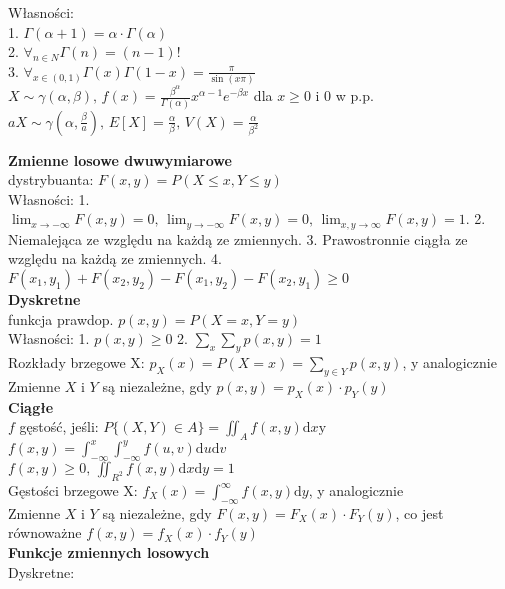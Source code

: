 \documentclass[10pt,landscape,a4paper,notitlepage]{article}
\begin{document}
\begin{multicols*}{4}
        Własności:\\
        1. $\Gamma(\alpha+1)=\alpha\cdot\Gamma(\alpha)$\\
        2. $\forall_{n\in N}\Gamma(n)=(n-1)!$\\
        3. $\forall_{x\in(0,1)}\Gamma(x)\Gamma(1-x)=\frac{\pi}{\sin(x\pi)}$\\
        $X\sim \gamma(\alpha,\beta),\,f(x)=\frac{\beta^{\alpha}}{\Gamma(\alpha)}x^{\alpha-1}e^{-\beta x}$ dla $x\geq 0$ i $0$ w p.p.\\
        $aX\sim\gamma(\alpha,\frac{\beta}{a}),\,E[X]=\frac{\alpha}{\beta},\,V(X)=\frac{\alpha}{\beta^2}$

        \noindent\textbf{\large Zmienne losowe dwuwymiarowe}\\
        dystrybuanta: $F(x,y)=P(X\leq x,Y\leq y)$\\
        Własności: 
        1. $\lim_{x\rightarrow-\infty}F(x,y)=0,\,\lim_{y\rightarrow-\infty}F(x,y)=0,\,\lim_{x,y\rightarrow\infty}F(x,y)=1$.
        2. Niemalejąca ze względu na każdą ze zmiennych.
        3. Prawostronnie ciągła ze względu na każdą ze zmiennych.
        4. $F(x_1,y_1)+F(x_2,y_2)-F(x_1,y_2)-F(x_2,y_1)\geq 0$\\
        \textbf{Dyskretne}\\
        funkcja prawdop. $p(x,y)=P(X=x,Y=y)$\\
        Własności:
        1. $p(x,y)\geq 0$
        2. $\sum_x\sum_yp(x,y)=1$\\
        Rozkłady brzegowe X: $p_X(x)=P(X=x)=\sum_{y\in Y}p(x,y)$, y analogicznie\\
        Zmienne $X$ i $Y$ są niezależne, gdy $p(x,y)=p_X(x)\cdot p_Y(y)$\\
        \textbf{Ciągłe}\\
        $f$ gęstość, jeśli: 
        $P\{(X,Y)\in A\}=\iint_Af(x,y)\mathrm{d}x\mathrm{y}$\\
        $f(x,y)=\int_{-\infty}^x\int_{-\infty}^yf(u,v)\mathrm{d}u\mathrm{d}v$\\
        $f(x,y)\geq 0,\,\iint_{R^2}f(x,y)\mathrm{d}x\mathrm{d}y=1$\\
        Gęstości brzegowe X: $f_X(x)=\int_{-\infty}^{\infty}f(x,y)\mathrm{d}y$, y analogicznie\\
        Zmienne $X$ i $Y$ są niezależne, gdy $F(x,y)=F_X(x)\cdot F_Y(y)$, co jest równoważne $f(x,y)=f_X(x)\cdot f_Y(y)$\\
        \textbf{Funkcje zmiennych losowych}\\
        Dyskretne:\\

\end{multicols*}
\end{document}
